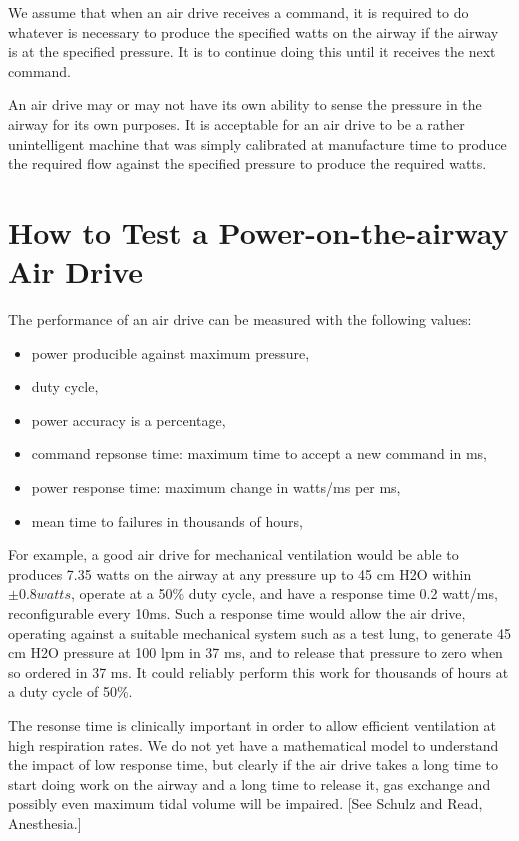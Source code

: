 \documentclass[conference]{article}
\begin{document}
We assume that when an air drive receives a command, it is required to
do whatever is necessary to produce the specified
watts on the airway if the airway is at the specified pressure.
It is to continue doing this until it receives the next command.

An air drive may or may not have its own ability to sense the pressure in the airway
for its own purposes. It is acceptable for an air drive to be a rather unintelligent
machine that was simply calibrated at manufacture time to produce the required
flow against the specified pressure to produce the required watts.

\section{How to Test a  Power-on-the-airway Air Drive}

The performance of an air drive can be measured with the following values:
\begin{itemize}
\item{power producible against maximum pressure,}
\item{duty cycle,}
\item{power accuracy is a percentage,}
\item{command repsonse time: maximum time to accept a new command in ms,}
\item{power response time: maximum change in watts/ms per ms,}
\item{mean time to failures in thousands of hours,}
\end{itemize}


For example, a good air drive for mechanical ventilation would be
able to produces 7.35 watts on the airway at any pressure up to 45 cm H2O within
$\pm 0.8 watts$, operate at a
50\% duty cycle, and have a response time 0.2 watt/ms, reconfigurable every 10ms.
Such a response time
would allow the air drive, operating against a suitable mechanical system such
as a test lung, to generate 45 cm H2O pressure at 100 lpm in 37 ms, and
to release that pressure to zero when so ordered in 37 ms.
It could reliably perform this work for thousands of hours at a duty cycle of 50\%.

The resonse time is clinically important in order to allow efficient ventilation
at high respiration rates.
We do not yet have a mathematical model to understand the impact of low response time,
but clearly if the air drive takes a long time to start doing work on the airway
and a long time to release it, gas exchange and possibly even maximum tidal volume
will be impaired. [See Schulz and Read, Anesthesia.]
\end{document}
